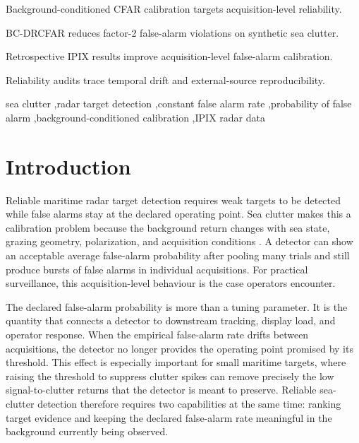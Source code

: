 \documentclass[preprint,12pt]{elsarticle}
\begin{document}
\begin{frontmatter}
\begin{highlights}
\item Background-conditioned CFAR calibration targets acquisition-level reliability.
\item BC-DRCFAR reduces factor-2 false-alarm violations on synthetic sea clutter.
\item Retrospective IPIX results improve acquisition-level false-alarm calibration.
\item Reliability audits trace temporal drift and external-source reproducibility.
\end{highlights}

\begin{keyword}
sea clutter \sep radar target detection \sep constant false alarm rate \sep probability of false alarm \sep background-conditioned calibration \sep IPIX radar data
\end{keyword}

\end{frontmatter}

\section{Introduction}
\label{sec:introduction}

Reliable maritime radar target detection requires weak targets to be detected
while false alarms stay at the declared operating point. Sea clutter makes this a
calibration problem because the background return changes with sea state,
grazing geometry, polarization, and acquisition conditions
\cite{ward2013seaclutter,watts2008seaclutter,greco2006polarimetric,greco2010nonstationarity}.
A detector can show
an acceptable average false-alarm probability after pooling many trials and
still produce bursts of false alarms in individual acquisitions. For practical
surveillance, this acquisition-level behaviour is the case operators encounter.

The declared false-alarm probability is more than a tuning parameter. It is the
quantity that connects a detector to downstream tracking, display load, and
operator response. When the empirical false-alarm rate drifts between
acquisitions, the detector no longer provides the operating point promised by
its threshold. This effect is especially important for small maritime targets,
where raising the threshold to suppress clutter spikes can remove precisely the
low signal-to-clutter returns that the detector is meant to preserve. Reliable
sea-clutter detection therefore requires two capabilities at the same time:
ranking target evidence and keeping the declared false-alarm rate meaningful in
the background currently being observed.
\end{document}
